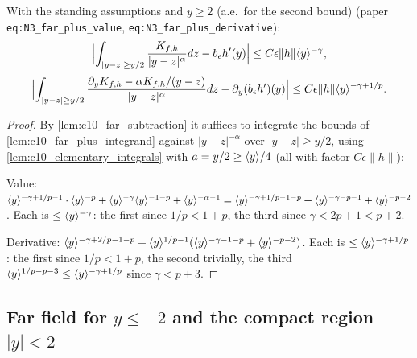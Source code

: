 \begin{lemma}
  \label{lem:c10_N3_far_plus}
  With the standing assumptions and $y\ge2$ (a.e.\ for the second bound)
  (paper \texttt{eq:N3\_far\_plus\_value}, \texttt{eq:N3\_far\_plus\_derivative}):
  \[
    \Bigl|\int_{|y-z|\ge y/2}\frac{K_{f,h}}{|y-z|^\alpha}dz-b_\epsilon h'(y)\Bigr|\le C\epsilon\|h\|\langle y \rangle^{-\gamma},
  \]
  \[
    \Bigl|\int_{|y-z|\ge y/2}\frac{\partial_yK_{f,h}-\alpha K_{f,h}/(y-z)}{|y-z|^\alpha}dz-\partial_y(b_\epsilon h')(y)\Bigr|\le C\epsilon\|h\|\langle y \rangle^{-\gamma+1/p}.
  \]
\end{lemma}
\begin{proof}
  By \cref{lem:c10_far_subtraction} it suffices to integrate the bounds of
  \cref{lem:c10_far_plus_integrand} against $|y-z|^{-\alpha}$ over $|y-z|\ge y/2$, using
  \cref{lem:c10_elementary_integrals} with $a=y/2\ge\langle y \rangle/4$ (all with factor $C\epsilon\|h\|$):

  Value: $\langle y \rangle^{-\gamma+1/p-1}\cdot\langle y \rangle^{-p}+\langle y \rangle^{-\gamma}\langle y \rangle^{-1-p}+\langle y \rangle^{-\alpha-1}=
  \langle y \rangle^{-\gamma+1/p-1-p}+\langle y \rangle^{-\gamma-p-1}+\langle y \rangle^{-p-2}$. Each is $\le\langle y \rangle^{-\gamma}$:
  the first since $1/p<1+p$, the third since $\gamma<2p+1<p+2$.

  Derivative: $\langle y \rangle^{-\gamma+2/p-1-p}+\langle y \rangle^{1/p-1}(\langle y \rangle^{-\gamma-1-p}+\langle y \rangle^{-p-2})$. Each is
  $\le\langle y \rangle^{-\gamma+1/p}$: the first since $1/p<1+p$, the second trivially, the third
  $\langle y \rangle^{1/p-p-3}\le\langle y \rangle^{-\gamma+1/p}$ since $\gamma<p+3$.
\end{proof}

\subsection{Far field for $y\le-2$ and the compact region $|y|<2$}

